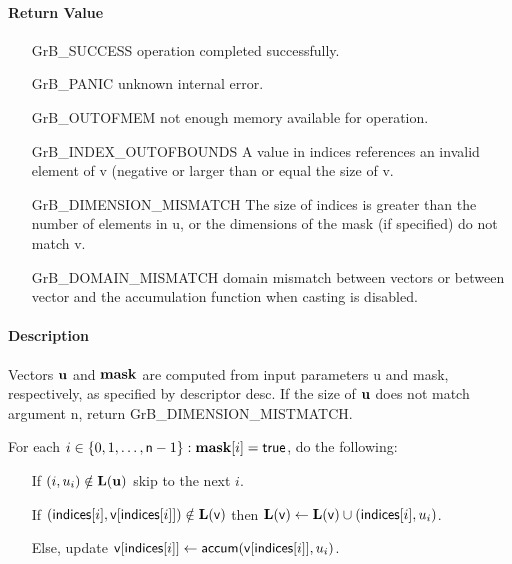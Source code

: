 \paragraph{Return Value}


\begin{itemize}[leftmargin=2.1in]
\item[{\sf GrB\_SUCCESS}]      operation completed successfully.
\item[{\sf GrB\_PANIC}]        unknown internal error.
\item[{\sf GrB\_OUTOFMEM}]     not enough memory available for operation.
\item[{\sf GrB\_INDEX\_OUTOFBOUNDS}]
        A value in {\sf indices} references an invalid element of {\sf v} (negative or larger than or equal the size of {\sf v}.
\item[{\sf GrB\_DIMENSION\_MISMATCH}] 
        The size of {\sf indices} is greater than the number of elements in {\sf u}, or
        the dimensions of the mask (if specified) do not match {\sf v}.
\item[\sf GrB\_DOMAIN\_MISMATCH]  
       domain mismatch between vectors or between vector and the accumulation function when casting is disabled.
\end{itemize}

\paragraph{Description}

Vectors ${\bf u}$ and ${\bf mask}$ are computed from input parameters {\sf u} and {\sf mask}, respectively, as specified by descriptor {\sf desc}. If
the size of ${\bf u}$ does not match argument {\sf n}, return {\sf GrB\_DIMENSION\_MISTMATCH}.

For each $i \in \{0, 1, \ldots, {\sf n}-1 \} : {\bf mask}[i] = {\sf true}$, do the following:
\begin{itemize}
	\item[] If $(i, u_i) \notin \bold{L}({\bf u})$ skip to the next $i$.
	\item[] If $({\sf indices}[i], {\sf v}[{\sf indices}[i]]) \notin \bold{L}({\sf v})$ then
	      $\bold{L}({\sf v}) \leftarrow \bold{L}({\sf v}) \cup ({\sf indices}[i],u_i)$.
	\item[] Else, update ${\sf v}[{\sf indices}[i]] \leftarrow {\sf accum}({\sf v}[{\sf indices}[i]],u_i)$.
\end{itemize}


